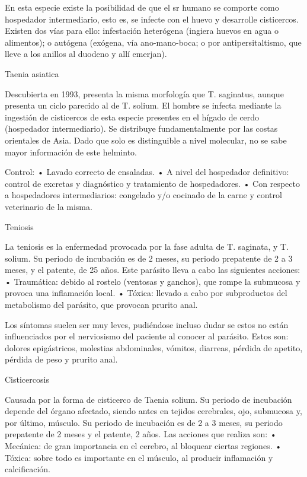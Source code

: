 En esta especie existe la posibilidad de que el sr humano se comporte como hospedador intermediario, esto es, se infecte con el huevo y desarrolle cisticercos. Existen dos vías para ello: infestación heterógena (ingiera huevos en agua o alimentos); o autógena (exógena, vía ano-mano-boca; o por antipersitaltismo, que lleve a los anillos al duodeno y allí emerjan). 



















Taenia asiatica

Descubierta en 1993, presenta la misma morfología que T. saginatus, aunque presenta un ciclo parecido al de T. solium. El hombre se infecta mediante la ingestión de cisticercos de esta especie presentes en el hígado de cerdo (hospedador intermediario). Se distribuye fundamentalmente por las costas orientales de Asia. Dado que solo es distinguible a nivel molecular, no se sabe mayor información de este helminto.

Control:
• Lavado correcto de ensaladas.
• A nivel del hospedador definitivo: control de excretas y diagnóstico y tratamiento de hospedadores.
• Con respecto a hospedadores intermediarios: congelado y/o cocinado de la carne y control veterinario de la misma.

Teniosis

La teniosis es la enfermedad provocada por la fase adulta de T. saginata, y T. solium. Su periodo de incubación es de 2 meses, su periodo prepatente de 2 a 3 meses, y el patente, de 25 años. Este parásito lleva a cabo las siguientes acciones:
• Traumática: debido al rostelo (ventosas y ganchos), que rompe la submucosa y provoca una inflamación local.
• Tóxica: llevado a cabo por subproductos del metabolismo del parásito, que provocan prurito anal.

Los síntomas suelen ser muy leves, pudiéndose incluso dudar se estos no están influenciados por el nerviosismo del paciente al conocer al parásito. Estos son: dolores epigástricos, molestias abdominales, vómitos, diarreas, pérdida de apetito, pérdida de peso y prurito anal.



Cisticercosis

Causada por la forma de cisticerco de Taenia solium. Su periodo de incubación depende del órgano afectado, siendo antes en tejidos cerebrales, ojo, submucosa y, por último, músculo. Su periodo de incubación es de 2 a 3 meses, su periodo prepatente de 2 meses y el patente, 2 años. Las acciones que realiza son:
• Mecánica: de gran importancia en el cerebro, al bloquear ciertas regiones.
• Tóxica: sobre todo es importante en el músculo, al producir inflamación y calcificación.

